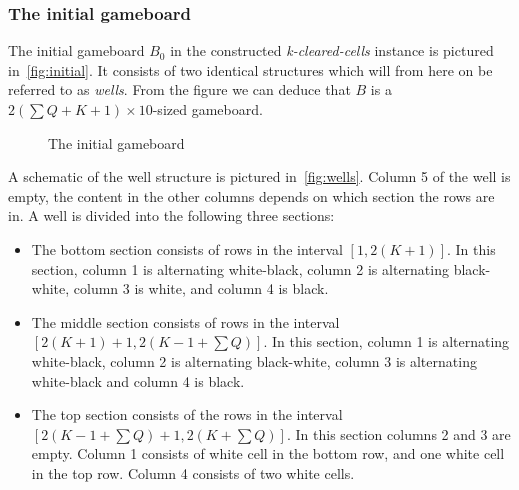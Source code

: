 \subsubsection{The initial gameboard}

The initial gameboard $B_0$ in the constructed \textit{k-cleared-cells} instance is pictured in~\autoref{fig:initial}. It consists of two identical structures which will from here on be referred to as \textit{wells}. From the figure we can deduce that $B$ is a $2 \left( \sum Q + K + 1 \right) \times 10$-sized gameboard.

\begin{figure}[H]
    \centering
    \caption{The initial gameboard}
    \label{fig:initial}
\end{figure}

A schematic of the well structure is pictured in~\autoref{fig:wells}. Column 5 of the well is empty, the content in the other columns depends on which section the rows are in. A well is divided into the following three sections:

\begin{itemize}
\item The bottom section consists of rows in the interval $\left[ 1, 2 \left( K+1 \right) \right]$. In this section, column 1 is alternating white-black, column 2 is alternating black-white, column 3 is white, and column 4 is black.

\item The middle section consists of rows in the interval $\left[ 2 \left( K+1 \right) +1, 2 \left( K-1 + \sum Q \right) \right]$. In this section, column 1 is alternating white-black, column 2 is alternating black-white, column 3 is alternating white-black and column 4 is black.

\item The top section consists of the rows in the interval $\left[2 \left( K-1 + \sum Q \right) +1, 2 \left( K + \sum Q \right) \right]$. In this section columns 2 and 3 are empty. Column 1 consists of white cell in the bottom row, and one white cell in the top row. Column 4 consists of two white cells.

\end{itemize}

